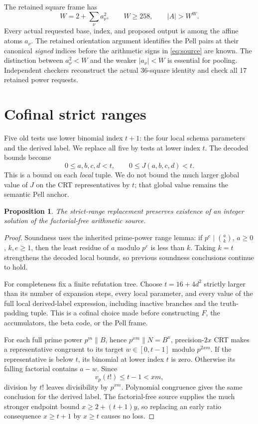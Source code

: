 \documentclass[11pt,letterpaper]{article}
\newtheorem{proposition}[theorem]{Proposition}
\theoremstyle{remark}
\begin{document}
The retained square frame has
\begin{equation}\label{eq:frame}
 W=2+\sum_\nu a_\nu^2,\qquad W\ge258,\qquad |A|>W^W.
\end{equation}
Every actual requested base, index, and proposed output is among
the affine atoms \(a_\nu\). The retained orientation argument identifies
the Pell pairs at their canonical \emph{signed} indices before the
arithmetic signs in \eqref{eq:source} are known.
The distinction between \(a_\nu^2<W\) and the weaker \(|a_\nu|<W\)
is essential for pooling. Independent checkers reconstruct the actual
36-square identity and check all 17 retained power requests.

\section{Cofinal strict ranges}

Five old tests use lower binomial index \(t+1\): the four local
schema parameters and the derived label. We replace all five by
tests at lower index \(t\). The decoded bounds become
\begin{equation}\label{eq:strict}
 0\le a,b,c,d<t,\qquad 0\le J(a,b,c,d)<t.
\end{equation}
This is a bound on each \emph{local} tuple. We do not bound the much
larger global value of \(J\) on the CRT representatives by \(t\);
that global value remains the semantic Pell anchor.

\begin{proposition}\label{prop:strict}
The strict-range replacement preserves existence of an integer
solution of the factorial-free arithmetic source.
\end{proposition}
\begin{proof}
Soundness uses the inherited prime-power range lemma:
if \(p^e\mid\binom{a}{k}\), \(a\ge0\), \(k,e\ge1\), then the least residue of
\(a\) modulo \(p^e\) is less than \(k\). Taking \(k=t\)
strengthens the decoded local bounds, so previous soundness
conclusions continue to hold.

For completeness fix a finite refutation tree. Choose \(t=16+4d^2\)
strictly larger than its number of expansion steps, every local
parameter, and every value of the full local derived-label expression,
including inactive branches and the truth-padding tuple. This is a
cofinal choice made before constructing \(F\), the accumulators,
the beta code, or the Pell frame.

For each full prime power \(p^m\mathbin{\|}B\), hence
\(p^{xm}\mathbin{\|}N=B^x\), precision-\(2x\) CRT
makes a representative congruent to its target \(w\in[0,t-1]\)
modulo \(p^{2xm}\). If the representative is below \(t\), its
binomial at lower index \(t\) is zero. Otherwise its falling
factorial contains \(a-w\). Since
\[
 v_p(t!)\le t-1<xm,
\]
division by \(t!\) leaves divisibility by \(p^{xm}\).
Polynomial congruence gives the same conclusion for the derived label.
The factorial-free source supplies the much stronger endpoint bound
\(x\ge2+(t+1)y\), so replacing an early ratio consequence
\(x\ge t+1\) by \(x\ge t\) causes no loss.
\end{proof}
\end{document}
